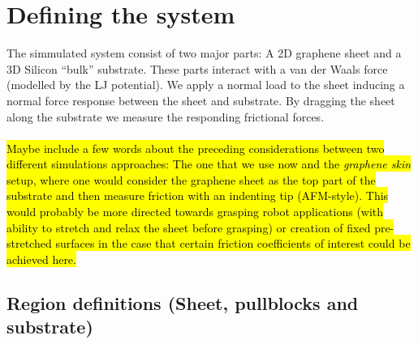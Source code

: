 \chapter{Defining the system}

The simmulated system consist of two major parts: A 2D graphene sheet and a 3D Silicon ``bulk'' substrate. These parts interact with a van der Waals force (modelled by the LJ potential). We apply a normal load to the sheet inducing a normal force response between the sheet and substrate. By dragging the sheet along the substrate we measure the responding frictional forces.
\\
\\
\hl{Maybe include a few words about the preceding considerations between two different simulations approaches: The one that we use now and the \textit{graphene skin} setup, where one would consider the graphene sheet as the top part of the substrate and then measure friction with an indenting tip (AFM-style). This would probably be more directed towards grasping robot applications (with ability to stretch and relax the sheet before grasping) or creation of fixed pre-stretched surfaces in the case that certain friction coefficients of interest could be achieved here.}

\section{Region definitions (Sheet, pullblocks and substrate)}


